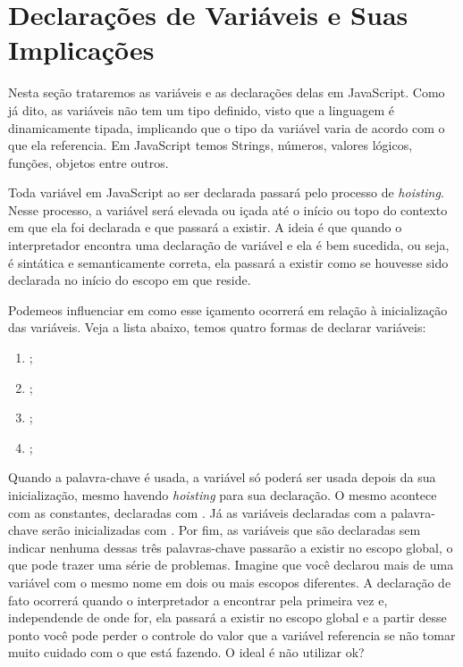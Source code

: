 \section{Declarações de Variáveis e Suas Implicações}

Nesta seção trataremos as variáveis e as declarações delas em JavaScript. Como já dito, as variáveis não tem um tipo definido, visto que a linguagem é dinamicamente tipada, implicando que o tipo da variável varia de acordo com o que ela referencia. Em JavaScript temos Strings, números, valores lógicos, funções, objetos entre outros.

Toda variável em JavaScript ao ser declarada passará pelo processo de \textit{hoisting}. Nesse processo, a variável será elevada ou içada até o início ou topo do contexto em que ela foi declarada e que passará a existir. A ideia é que quando o interpretador encontra uma declaração de variável e ela é bem sucedida, ou seja, é sintática e semanticamente correta, ela passará a existir como se houvesse sido declarada no início do escopo em que reside.

Podemeos influenciar em como esse içamento ocorrerá em relação à inicialização das variáveis. Veja a lista abaixo, temos quatro formas de declarar variáveis:

\begin{enumerate}
    \item {};
    \item {};
    \item {};
    \item {};
\end{enumerate}

Quando a palavra-chave  é usada, a variável só poderá ser usada depois da sua inicialização, mesmo havendo \textit{hoisting} para sua declaração. O mesmo acontece com as constantes, declaradas com . Já as variáveis declaradas com a palavra-chave  serão inicializadas com . Por fim, as variáveis que são declaradas sem indicar nenhuma dessas três palavras-chave passarão a existir no escopo global, o que pode trazer uma série de problemas. Imagine que você declarou mais de uma variável com o mesmo nome em dois ou mais escopos diferentes. A declaração de fato ocorrerá quando o interpretador a encontrar pela primeira vez e, independende de onde for, ela passará a existir no escopo global e a partir desse ponto você pode perder o controle do valor que a variável referencia se não tomar muito cuidado com o que está fazendo. O ideal é não utilizar ok?

